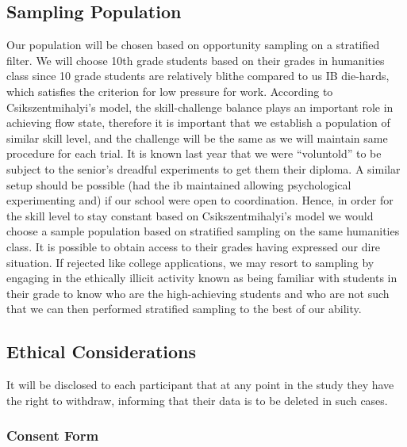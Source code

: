 \documentclass{article}
\begin{document}
\subsection{Sampling Population}
Our population will be chosen based on opportunity sampling on a stratified filter. We will choose 10th grade students based on their grades in humanities class since 10 grade students are relatively blithe compared to us IB die-hards, which satisfies the criterion for low pressure for work.
According to Csikszentmihalyi's model, the skill-challenge balance plays an important role in achieving flow state, %
therefore it is important that we establish a population of similar skill level, and the challenge will be the same as we will maintain same procedure for each trial.
It is known last year that we were ``voluntold'' to be subject to the senior's dreadful experiments to get them their diploma. A similar setup should be possible (had the ib maintained allowing psychological experimenting and) if our school were open to coordination. 
Hence, in order for the skill level to stay constant based on Csikszentmihalyi's model we would choose a sample population based on stratified sampling on the same humanities class. It is possible to obtain access to their grades having expressed our dire situation. If rejected like college applications, we may resort to sampling by engaging in the ethically illicit activity known as being familiar with students in their grade to know who are the high-achieving students and who are not such that we can then performed stratified sampling to the best of our ability.

\subsection{Ethical Considerations}
It will be disclosed to each participant that at any point in the study they have the right to withdraw, informing that their data is to be deleted in such cases.

\subsubsection{Consent Form}
\end{document}
